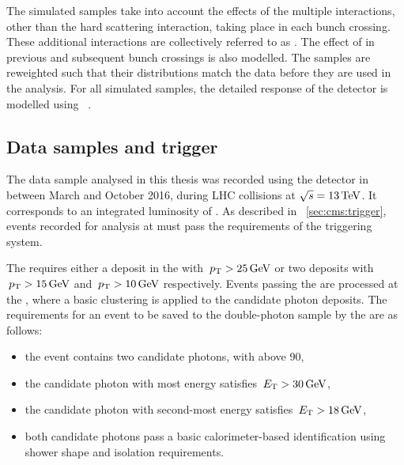 The simulated samples take into account the effects of the multiple interactions, other than the hard scattering interaction, taking place in each bunch crossing. These additional interactions are collectively referred to as \PU. The effect of \PU in previous and subsequent bunch crossings is also modelled. The samples are reweighted such that their \PU distributions match the data before they are used in the analysis.
For all simulated samples, the detailed response of the \CMS detector is modelled using \Geant~\cite{Geant}.


\subsection{Data samples and trigger} %
\label{sec:reco:data}

The data sample analysed in this thesis was recorded using the \CMS detector in between March and October 2016, during \pp LHC collisions at $\sqrt{s}=13\,\text{Te\hspace{-.08em}V}$. It corresponds to an integrated luminosity of \totaldatatwentysixteen\ifb. As described in \Sec~\ref{sec:cms:trigger}, events recorded for analysis at \CMS must pass the requirements of the triggering system. 

The \LI requires either a deposit in the \ECAL with $\,p_\text{T}>25\,\text{Ge\hspace{-.08em}V}$ or two deposits with $\,p_\text{T}>15\,\text{Ge\hspace{-.08em}V}$ and $\,p_\text{T}>10\,\text{Ge\hspace{-.08em}V}$ respectively. Events passing the \LI are processed at the \HLT, where a basic clustering is applied to the candidate photon deposits. The requirements for an event to be saved to the double-photon sample by the \HLT are as follows:

\begin{itemize}
\item the event contains two candidate photons, with \mgg above 90\GeV,
\item the candidate photon with most energy satisfies $\,E_\text{T} >30\,\text{Ge\hspace{-.08em}V}$, 
\item the candidate photon with second-most energy satisfies $\,E_\text{T} >18\,\text{Ge\hspace{-.08em}V}$,
\item both candidate photons pass a basic calorimeter-based identification using shower shape and isolation requirements.
\end{itemize}



